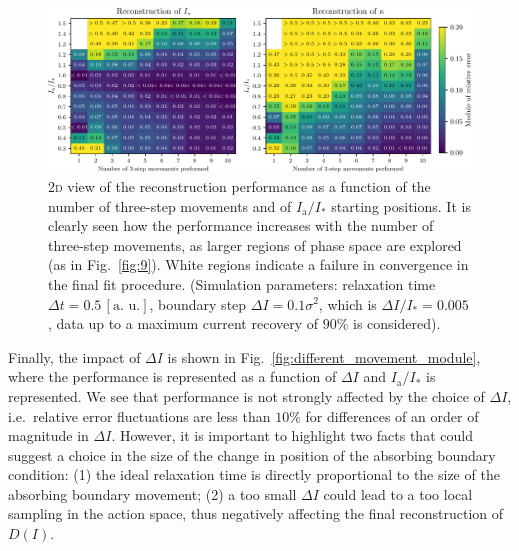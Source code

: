 \begin{figure}[t]
    \centering
    \includegraphics[width=\textwidth]{4_probing_the_diffusive_behavior/figs/final/MULTI_different_samples.pdf}
    \caption{2\textsc{d} view of the reconstruction performance as a function of the number of three-step movements and of $I_\mathrm{a}/I_\ast$ starting positions. It is clearly seen how the performance increases with the number of three-step movements, as larger regions of phase space are explored (as in Fig.~\ref{fig:9}). White regions indicate a failure in convergence in the final fit procedure. (Simulation parameters: relaxation time $\Delta t=0.5 \, [\text{a. u.}]$, boundary step $\Delta I=0.1 \sigma^2$, which is $\Delta I / I_\ast = 0.005$, data up to a maximum current recovery of $90\%$ is considered).}
    \label{fig:different_nsamples}
\end{figure}

Finally, the impact of $\Delta I$ is shown in Fig.~\ref{fig:different_movement_module}, where the performance is represented as a function of $\Delta I$ and $I_\mathrm{a}/I_\ast$ is represented.  We see that performance is not strongly affected by the choice of $\Delta I$, i.e.\ relative error fluctuations are less than $10\%$ for differences of an order of magnitude in $\Delta I$. However, it is important to highlight two facts that could suggest a choice in the size of the change in position of the absorbing boundary condition: (1) the ideal relaxation time is directly proportional to the size of the absorbing boundary movement; (2) a too small $\Delta I$ could lead to a too local sampling in the action space, thus negatively affecting the final reconstruction of $D(I)$. 

